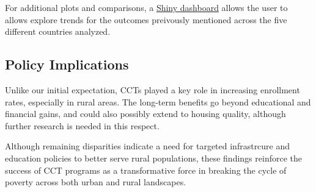 \documentclass[
  10pt,
]{article}
\begin{document}
For additional plots and comparisons, a \href{./shiny-app/app.py}{Shiny
dashboard} allows the user to allows explore trends for the outcomes
preivously mentioned across the five different countries analyzed.

\subsection{Policy Implications}\label{policy-implications}

Unlike our initial expectation, CCTs played a key role in increasing
enrollment rates, especially in rural areas. The long-term benefits go
beyond educational and financial gains, and could also possibly extend
to housing quality, although further research is needed in this respect.

Although remaining disparities indicate a need for targeted infrastrcure
and education policies to better serve rural populations, these findings
reinforce the success of CCT programs as a transformative force in
breaking the cycle of poverty across both urban and rural landscapes.
\end{document}
